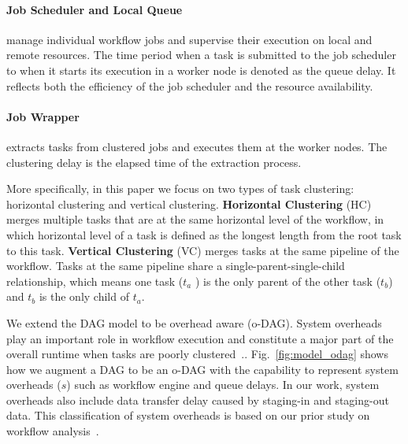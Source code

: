 \paragraph{Job Scheduler and Local Queue} manage individual workflow jobs and supervise their execution on local and remote resources. The time period when a task is submitted to the job scheduler to when it starts its execution in a worker node is denoted as the queue delay. It reflects both the efficiency of the job scheduler and the resource availability. 

\paragraph{Job Wrapper} extracts tasks from clustered jobs and executes them at the worker nodes. The clustering delay is the  elapsed time of the extraction process.

More specifically, in this paper we focus on two types of task clustering: horizontal clustering and vertical clustering. \textbf{Horizontal Clustering} (HC) merges multiple tasks that are at the same horizontal level of the workflow, in which horizontal level of a task is defined as the longest length from the root task to this task. \textbf{Vertical Clustering} (VC) merges tasks at the same pipeline of the workflow. Tasks at the same pipeline share a single-parent-single-child relationship, which means one task ($t_a$ ) is the only parent of the other task ($t_b$) and $t_b$ is the only child of $t_a$. 

We extend the DAG model to be overhead aware (o-DAG). System overheads play an important role in workflow execution and constitute a major part of the overall runtime when tasks are poorly clustered~\cite{Chen2011}.. Fig.~\ref{fig:model_odag} shows how we augment a DAG to be an o-DAG with the capability to represent system overheads ($s$) such as workflow engine and queue delays. In our work, system overheads also include data transfer delay caused by staging-in and staging-out data. This classification of system overheads is based on our prior study on workflow analysis~\cite{Chen2011}. 

